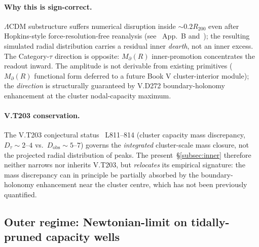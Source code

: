 \documentclass{pantarhei-researchnote}
\newcommand{\Mpa}{M_{\partial}}                 %
\newcommand{\Rtwohun}{R_{200}}
\begin{document}
\paragraph{Why this is sign-correct.}
$\Lambda$CDM substructure suffers numerical disruption inside $\sim 0.2
\Rtwohun$ even after Hopkins-style force-resolution-free reanalysis
(see~\cite{Natarajan2026} App.~B and~\cite{Hopkins2023,
ChiangTNGC2026}); the resulting simulated radial distribution carries
a residual inner \emph{dearth}, not an inner excess. The Category-$\tau$
direction is opposite: $\Mpa(R)$ inner-promotion concentrates the readout
inward. The amplitude is not derivable from existing primitives
($\Mpa(R)$ functional form deferred to a future Book V cluster-interior
module); the \emph{direction} is structurally guaranteed by V.D272
boundary-holonomy enhancement at the cluster nodal-capacity maximum.

\paragraph{V.T203 conservation.}
The V.T203 conjectural status~\cite{KSZCategorical} L811--814
(cluster capacity mass discrepancy, $D_\tau \sim 2$--$4$ vs.\
$D_{\mathrm{obs}} \sim 5$--$7$) governs the \emph{integrated}
cluster-scale mass closure, not the projected radial distribution of
peaks. The present~\S\ref{subsec:inner} therefore neither narrows nor
inherits V.T203, but \emph{relocates} its empirical signature: the
mass discrepancy can in principle be partially absorbed by the
boundary-holonomy enhancement near the cluster centre, which has not
been previously quantified.

\subsection{Outer regime: Newtonian-limit on tidally-pruned capacity wells}\label{subsec:outer}
\end{document}
